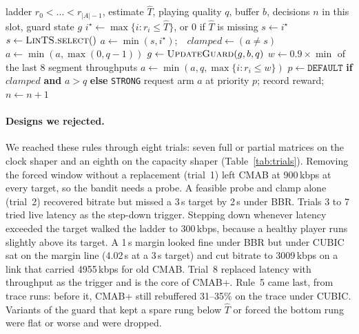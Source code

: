 \documentclass[sigconf]{acmart}
\newcommand{\cmabp}{CMAB+\xspace}
\newcommand{\oldcmab}{old CMAB\xspace}
\newcommand{\That}{\hat{T}}
\newcommand{\kbps}{\,kbps\xspace}
\begin{document}
\begin{algorithm}[t]
\caption{One CMAB+ decision}
\label{alg:cmabplus}
\small
\begin{algorithmic}[1]
\Require ladder $r_0<\dots<r_{|A|-1}$, estimate $\That$, playing quality $q$, buffer $b$, decisions $n$ in this slot, guard state $g$
\State $i^\star \gets \max\{i : r_i \le \That\}$, or $0$ if $\That$ is missing
 $s \gets i^\star$ 
\Else\ $s \gets \textsc{LinTS.select}()$
\EndIf
\State $a \gets \min(s, i^\star)$;\ \ $clamped \gets (a \ne s)$ 
\If{$q \ge 0$ \textbf{and} $r_q > \That$} $a \gets \min(a, \max(0, q-1))$ 
\EndIf
\State $g \gets \textsc{UpdateGuard}(g, b, q)$ 
  \State $w \gets 0.9 \times \min$ of the last 8 segment throughputs
  \State $a \gets \min(a, q, \max\{i : r_i \le w\})$ 
\EndIf
\State $p \gets \texttt{DEFAULT}$ \textbf{if} $clamped$ \textbf{and} $a>q$ \textbf{else} \texttt{STRONG} 
\State request arm $a$ at priority $p$; record reward; $n \gets n+1$
\end{algorithmic}
\end{algorithm}

\paragraph{Designs we rejected.} We reached these rules through eight trials: seven full or partial matrices on the clock shaper and an eighth on the capacity shaper (Table~\ref{tab:trials}). Removing the forced window without a replacement (trial~1) left CMAB at 900\kbps at every target, so the bandit needs a probe. A feasible probe and clamp alone (trial~2) recovered bitrate but missed a 3\,s target by 2\,s under BBR. Trials 3 to 7 tried live latency as the step-down trigger. Stepping down whenever latency exceeded the target walked the ladder to 300\kbps, because a healthy player runs slightly above its target. A 1\,s margin looked fine under BBR but under CUBIC sat on the margin line (4.02\,s at a 3\,s target) and cut bitrate to 3009\kbps on a link that carried 4955\kbps for \oldcmab. Trial~8 replaced latency with throughput as the trigger and is the core of \cmabp. Rule~5 came last, from trace runs: before it, CMAB+ still rebuffered 31--35\% on the trace under CUBIC. Variants of the guard that kept a spare rung below $\That$ or forced the bottom rung were flat or worse and were dropped.
\end{document}
